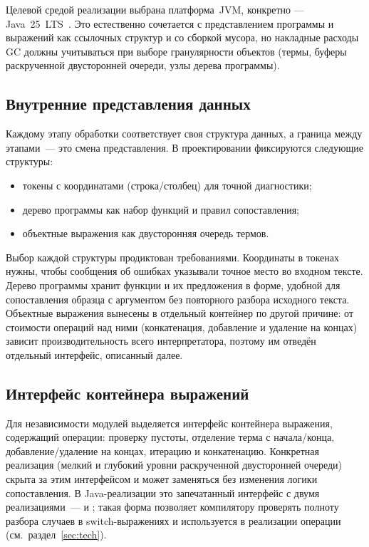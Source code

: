 Целевой средой реализации выбрана платформа~JVM, конкретно --- Java~25~LTS~\cite{java_se25_spec}.
Это естественно сочетается с представлением программы и выражений как ссылочных структур и со
сборкой мусора, но накладные расходы GC должны учитываться при выборе гранулярности
объектов (термы, буферы раскрученной двусторонней очереди, узлы дерева программы).

\subsection{Внутренние представления данных}

Каждому этапу обработки соответствует своя структура данных, а граница между этапами~---
это смена представления. В проектировании фиксируются следующие структуры:
\begin{itemize}
  \item токены с координатами (строка/столбец) для точной диагностики;
  \item дерево программы как набор функций и правил сопоставления;
  \item объектные выражения как двусторонняя очередь термов.
\end{itemize}

Выбор каждой структуры продиктован требованиями. Координаты в токенах нужны, чтобы
сообщения об ошибках указывали точное место во входном тексте. Дерево программы хранит
функции и их предложения в форме, удобной для сопоставления образца с аргументом без
повторного разбора исходного текста. Объектные выражения вынесены в отдельный контейнер по другой причине: от стоимости
операций над ними (конкатенация, добавление и удаление на концах) зависит
производительность всего интерпретатора, поэтому им отведён отдельный интерфейс, описанный
далее.

\subsection{Интерфейс контейнера выражений}

Для независимости модулей выделяется интерфейс контейнера выражения, содержащий операции:
проверку пустоты, отделение терма с начала/конца, добавление/удаление на концах, итерацию и конкатенацию.
Конкретная реализация (мелкий и глубокий уровни раскрученной двусторонней очереди) скрыта за этим
интерфейсом и может заменяться без изменения логики сопоставления. В Java-реализации это
запечатанный интерфейс  с двумя реализациями~---  и
; такая форма позволяет компилятору проверять полноту разбора случаев в
switch-выражениях и используется в реализации операции  (см.~раздел~\ref{sec:tech}).

